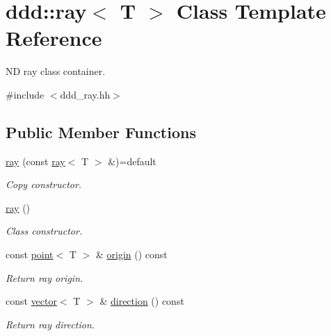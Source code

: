 \hypertarget{classddd_1_1ray}{}\section{ddd\+:\+:ray$<$ T $>$ Class Template Reference}
\label{classddd_1_1ray}


ND ray class container.  




{\ttfamily \#include $<$ddd\+\_\+ray.\+hh$>$}

\subsection*{Public Member Functions}
\begin{DoxyCompactItemize}
\item 
\mbox{\label{classddd_1_1ray_a7262ad98c0ba222969241df6e3986f2d}} 
\hyperlink{classddd_1_1ray_a7262ad98c0ba222969241df6e3986f2d}{ray} (const \hyperlink{classddd_1_1ray}{ray}$<$ T $>$ \&)=default
\begin{DoxyCompactList}\small\item\em Copy constructor. \end{DoxyCompactList}\item 
\mbox{\label{classddd_1_1ray_a608816826f457db78e459e7c1f0d5a3a}} 
\hyperlink{classddd_1_1ray_a608816826f457db78e459e7c1f0d5a3a}{ray} ()
\begin{DoxyCompactList}\small\item\em Class constructor. \end{DoxyCompactList}\item 
\mbox{\label{classddd_1_1ray_a92ad567ccc11d6d2bb9faa66cefbb9ca}} 
const \hyperlink{classddd_1_1point}{point}$<$ T $>$ \& \hyperlink{classddd_1_1ray_a92ad567ccc11d6d2bb9faa66cefbb9ca}{origin} () const
\begin{DoxyCompactList}\small\item\em Return ray origin. \end{DoxyCompactList}\item 
\mbox{\label{classddd_1_1ray_a8c6a38d8e1fcda4a44791ad17c99866e}} 
const \hyperlink{classddd_1_1vector}{vector}$<$ T $>$ \& \hyperlink{classddd_1_1ray_a8c6a38d8e1fcda4a44791ad17c99866e}{direction} () const
\begin{DoxyCompactList}\small\item\em Return ray direction. \end{DoxyCompactList}\end{DoxyCompactItemize}


